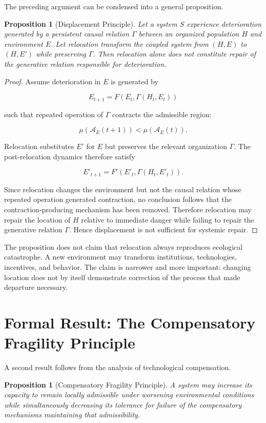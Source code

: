 \documentclass[11pt,oneside]{book}
\newtheorem{proposition}[theorem]{Proposition}
\theoremstyle{definition}
\theoremstyle{remark}
\newcommand{\A}{\mathcal{A}}
\begin{document}
The preceding argument can be condensed into a general proposition.

\begin{proposition}[Displacement Principle]
Let a system \(S\) experience deterioration generated by a persistent causal relation \(\Gamma\) between an organized population \(H\) and environment \(E\). Let relocation transform the coupled system from \((H,E)\) to \((H,E')\) while preserving \(\Gamma\). Then relocation alone does not constitute repair of the generative relation responsible for deterioration.
\end{proposition}

\begin{proof}
Assume deterioration in \(E\) is generated by

\[
E_{t+1}
=
F(E_t,\Gamma(H_t,E_t))
\]

such that repeated operation of \(\Gamma\) contracts the admissible region:

\[
\mu(\A_E(t+1))
<
\mu(\A_E(t)).
\]

Relocation substitutes \(E'\) for \(E\) but preserves the relevant organization \(\Gamma\). The post-relocation dynamics therefore satisfy

\[
E'_{t+1}
=
F'(E'_t,\Gamma(H_t,E'_t)).
\]

Since relocation changes the environment but not the causal relation whose repeated operation generated contraction, no conclusion follows that the contraction-producing mechanism has been removed. Therefore relocation may repair the location of \(H\) relative to immediate danger while failing to repair the generative relation \(\Gamma\). Hence displacement is not sufficient for systemic repair.
\end{proof}

The proposition does not claim that relocation always reproduces ecological catastrophe. A new environment may transform institutions, technologies, incentives, and behavior. The claim is narrower and more important: changing location does not by itself demonstrate correction of the process that made departure necessary.

\section{Formal Result: The Compensatory Fragility Principle}

A second result follows from the analysis of technological compensation.

\begin{proposition}[Compensatory Fragility Principle]
A system may increase its capacity to remain locally admissible under worsening environmental conditions while simultaneously decreasing its tolerance for failure of the compensatory mechanisms maintaining that admissibility.
\end{proposition}
\end{document}
